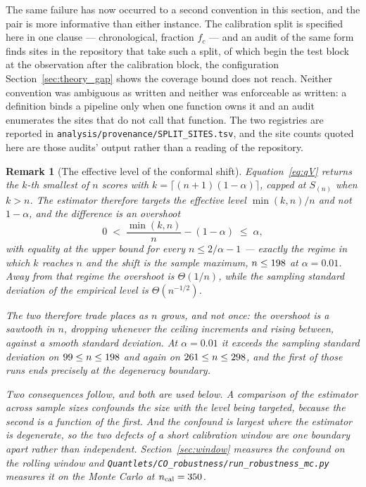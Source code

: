 \documentclass[preprint,11pt,authoryear]{elsarticle}
\newtheorem{remark}[theorem]{Remark}
\newcommand{\1}{\boldsymbol{1}}
\begin{document}
The same failure has now occurred to a second convention in this section, and
the pair is more informative than either instance. The calibration split is
specified here in one clause --- chronological, fraction $f_c$ --- and an audit
of the same form finds \nSplitSites{} sites in the repository that take such a
split, \nSplitContiguous{} of which begin the test block at the observation
after the calibration block, the configuration
Section~\ref{sec:theory_gap} shows the coverage bound does not reach. Neither
convention was ambiguous as written and neither was enforceable as written: a
definition binds a pipeline only when one function owns it and an audit
enumerates the sites that do not call that function. The two registries are
reported in \texttt{analysis/provenance/SPLIT\_SITES.tsv}, and the site counts quoted here are those audits'
output rather than a reading of the repository.

\begin{remark}[The effective level of the conformal shift]
	\label{rem:effective_level}
	Equation~\eqref{eq:qV} returns the $k$-th smallest of $n$ scores with
	$k = \lceil (n+1)(1-\alpha)\rceil$, capped at $S_{(n)}$ when $k > n$. The
	estimator therefore targets the \emph{effective level} $\min(k,n)/n$ and not
	$1-\alpha$, and the difference is an overshoot
	\[
		0 \;<\; \frac{\min(k,n)}{n} - (1-\alpha) \;\le\; \alpha ,
	\]
	with equality at the upper bound for every $n \le 2/\alpha - 1$ --- exactly
	the regime in which $k$ reaches $n$ and the shift is the sample maximum,
	$n \le 198$ at $\alpha = 0.01$. Away from that regime the overshoot
	is $\Theta(1/n)$, while the sampling standard deviation of the empirical
	level is $\Theta(n^{-1/2})$.

	The two therefore trade places as $n$ grows, and not once: the overshoot is a
	sawtooth in $n$, dropping whenever the ceiling increments and rising between,
	against a smooth standard deviation. At $\alpha = 0.01$ it exceeds the
	sampling standard deviation on $99 \le n \le 198$ and
	again on $261 \le n \le 298$, and the first of those
	runs ends precisely at the degeneracy boundary.

	Two consequences follow, and both are used below. A comparison of the
	estimator across sample sizes confounds the size with the level being
	targeted, because the second is a function of the first. And the confound is
	largest where the estimator is degenerate, so the two defects of a short
	calibration window are one boundary apart rather than independent. Section~\ref{sec:window}
	measures the confound on the rolling window and \texttt{Quantlets/CO\_robustness/run\_robustness\_mc.py} measures it
	on the Monte Carlo at $n_{\mathrm{cal}} = 350$.
\end{remark}
\end{document}
